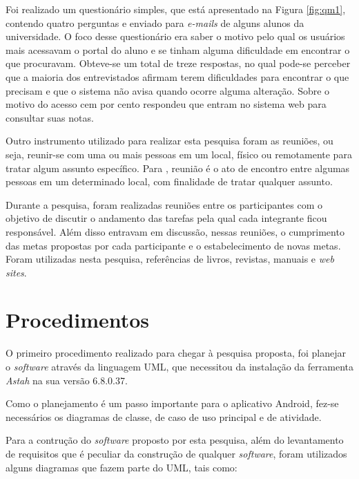 	\par Foi realizado um questionário simples, que está apresentado na Figura
\ref{fig:qm1}, contendo quatro perguntas e enviado para \textit{e-mails} de
alguns alunos da universidade. O foco desse questionário era saber o motivo pelo qual
os usuários mais acessavam o portal do aluno e se tinham alguma dificuldade em
encontrar o que procuravam. Obteve-se um total de treze respostas, no qual
pode-se perceber que a maioria dos entrevistados afirmam terem dificuldades
para encontrar o que precisam e que o sistema não avisa quando ocorre alguma
alteração. Sobre o motivo do acesso cem por cento respondeu que entram no
sistema web para consultar suas notas.

	\par Outro instrumento utilizado para realizar esta pesquisa foram as
reuniões, ou seja, reunir-se com uma ou mais pessoas em um local, físico ou
remotamente para tratar algum assunto específico. Para
, reunião é o ato de encontro entre algumas pessoas em
um determinado local, com finalidade de tratar qualquer assunto.

	\par Durante a pesquisa, foram realizadas reuniões entre os participantes com
o objetivo de discutir o andamento das tarefas pela qual cada integrante ficou
responsável. Além disso entravam em discussão, nessas reuniões, o cumprimento
das metas propostas por cada participante e o estabelecimento de novas metas.
Foram utilizadas nesta pesquisa, referências de livros, revistas, manuais e \textit{web
sites}.


\section{Procedimentos}
	
	\par O primeiro procedimento realizado para chegar à pesquisa proposta, foi
planejar o \textit{software} através da linguagem UML, que necessitou da
instalação da ferramenta \textit{Astah} na sua versão 6.8.0.37.

	\par Como o planejamento é um passo importante para o aplicativo Android,
fez-se necessários os diagramas de classe, de caso de uso principal e de
atividade.
	
	\par Para a contrução do \textit{software} proposto por esta pesquisa, além do
levantamento de requisitos que é peculiar da construção de qualquer \textit{software}, 
foram utilizados alguns diagramas que fazem parte do UML, tais como:

